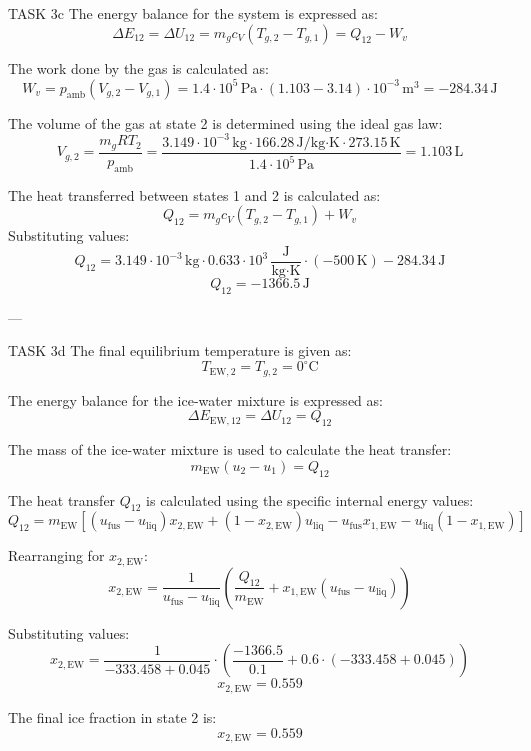 TASK 3c  
The energy balance for the system is expressed as:  
\[
\Delta E_{12} = \Delta U_{12} = m_g c_V (T_{g,2} - T_{g,1}) = Q_{12} - W_v
\]  

The work done by the gas is calculated as:  
\[
W_v = p_{\text{amb}}(V_{g,2} - V_{g,1}) = 1.4 \cdot 10^5 \, \text{Pa} \cdot (1.103 - 3.14) \cdot 10^{-3} \, \text{m}^3 = -284.34 \, \text{J}
\]  

The volume of the gas at state 2 is determined using the ideal gas law:  
\[
V_{g,2} = \frac{m_g R T_2}{p_{\text{amb}}} = \frac{3.149 \cdot 10^{-3} \, \text{kg} \cdot 166.28 \, \text{J/kg·K} \cdot 273.15 \, \text{K}}{1.4 \cdot 10^5 \, \text{Pa}} = 1.103 \, \text{L}
\]  

The heat transferred between states 1 and 2 is calculated as:  
\[
Q_{12} = m_g c_V (T_{g,2} - T_{g,1}) + W_v
\]  
Substituting values:  
\[
Q_{12} = 3.149 \cdot 10^{-3} \, \text{kg} \cdot 0.633 \cdot 10^3 \, \frac{\text{J}}{\text{kg·K}} \cdot (-500 \, \text{K}) - 284.34 \, \text{J}
\]  
\[
Q_{12} = -1366.5 \, \text{J}
\]  

---

TASK 3d  
The final equilibrium temperature is given as:  
\[
T_{\text{EW},2} = T_{g,2} = 0^\circ \text{C}
\]  

The energy balance for the ice-water mixture is expressed as:  
\[
\Delta E_{\text{EW},12} = \Delta U_{12} = Q_{12}
\]  

The mass of the ice-water mixture is used to calculate the heat transfer:  
\[
m_{\text{EW}} (u_2 - u_1) = Q_{12}
\]  

The heat transfer \( Q_{12} \) is calculated using the specific internal energy values:  
\[
Q_{12} = m_{\text{EW}} \left[ (u_{\text{fus}} - u_{\text{liq}}) x_{2,\text{EW}} + (1 - x_{2,\text{EW}}) u_{\text{liq}} - u_{\text{fus}} x_{1,\text{EW}} - u_{\text{liq}} (1 - x_{1,\text{EW}}) \right]
\]  

Rearranging for \( x_{2,\text{EW}} \):  
\[
x_{2,\text{EW}} = \frac{1}{u_{\text{fus}} - u_{\text{liq}}} \left( \frac{Q_{12}}{m_{\text{EW}}} + x_{1,\text{EW}} (u_{\text{fus}} - u_{\text{liq}}) \right)
\]  

Substituting values:  
\[
x_{2,\text{EW}} = \frac{1}{-333.458 + 0.045} \cdot \left( \frac{-1366.5}{0.1} + 0.6 \cdot (-333.458 + 0.045) \right)
\]  
\[
x_{2,\text{EW}} = 0.559
\]  

The final ice fraction in state 2 is:  
\[
x_{2,\text{EW}} = 0.559
\]